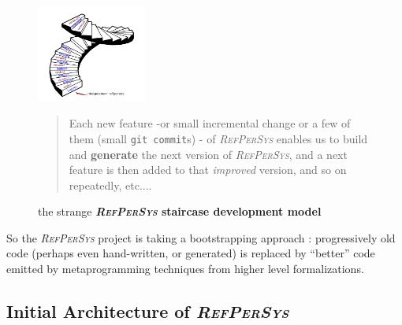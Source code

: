\documentclass{ecai}
\newcommand{\RefPerSys}{{\textit{\textsc{RefPerSys}}}}
\begin{document}
\begin{figure}[h]
  \begin{center}
    \includegraphics[width=0.32\textwidth]{spiral-stairs}
  \end{center}

  \begin{quote}
    \begin{relsize}{-0.4}
    Each new feature -or small incremental change or a few of them
    (small \texttt{git commit}s) - of {\RefPerSys} enables us to build
    and \textbf{generate} the next version of {\RefPerSys}, and a next
    feature is then added to that \textit{improved} version, and so on
    repeatedly, etc....
    \end{relsize}
  \end{quote}
  
  \caption{the strange \textbf{{\RefPerSys} staircase development model} {}}
  \label{fig:bootstrap-stair}
\end{figure}

So the {\RefPerSys} project is taking a bootstrapping approach
\cite{Pitrat:1996:FGCS, Pitrat:2009:ArtifBeings,
  hernandez-phillips:2019:debugging-bootstrap} : progressively old
code (perhaps even hand-written, or generated) is replaced by
``better'' code emitted by metaprogramming techniques from higher
level formalizations.

\subsection{Initial Architecture of \RefPerSys}
\label{subsec:initarchi}
\end{document}
